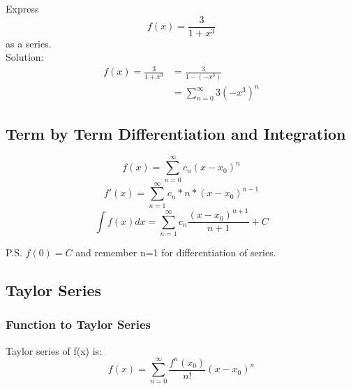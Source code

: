	\begin{simple}{}{}
	    Express 
	    $$f(x)=\frac{3}{1+x^3}$$
	    as a series.\\
	    Solution:
	    \begin{align*}
	        f(x)=\frac{3}{1+x^3}&=\frac{3}{1-(-x^3)}\\
	        &=\sum^\infty_{n=0}3(-x^3)^n
	    \end{align*}
	\end{simple}
	
	\subsection{Term by Term Differentiation and Integration}
	\begin{theorem}{}{}
	\begin{equation}
	    f(x)=\sum^\infty_{n=0}c_n(x-x_0)^n
	\end{equation}
	\begin{equation}
	    f'(x)=\sum^\infty_{n=1}c_n*n*(x-x_0)^{n-1}
	\end{equation}
	\begin{equation}
	    \int f(x)dx=\sum^\infty_{n=1}c_n\frac{(x-x_0)^{n+1}}{n+1}+C
	\end{equation}
	
	P.S. $f(0)=C$ and remember n=1 for differentiation of series.
	\end{theorem}
	
	\subsection{Taylor Series}
	\subsubsection{Function to Taylor Series}
	\begin{theorem}{}{}
	Taylor series of f(x) is:
	\begin{equation}{}{}
	    f(x)=\sum^\infty_{n=0}\frac{f^n(x_0)}{n!}(x-x_0)^n
	\end{equation}
	\end{theorem}
	

